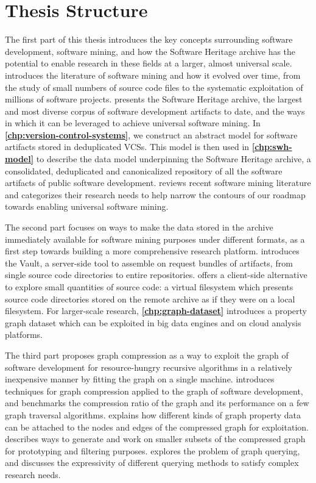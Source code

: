 \chapter*{Thesis Structure}

The first part of this thesis introduces the key concepts surrounding
software development, software mining, and how the Software Heritage archive
has the potential to enable research in these fields at a larger, almost
universal scale.
\textbf{} introduces the literature of software mining
and how it evolved over time, from the study of small numbers of source code
files to the systematic exploitation of millions of software projects.
\textbf{} presents the Software Heritage archive,
the largest and most diverse corpus of software development artifacts to date,
and the ways in which it can be leveraged to achieve universal software mining.
In \textbf{\cref{chp:version-control-systems}}, we construct an abstract model
for software artifacts stored in deduplicated \glspl{VCS}. This model is then
used in \textbf{\cref{chp:swh-model}} to describe the data model underpinning
the Software Heritage archive, a consolidated, deduplicated and canonicalized
repository of all the software artifacts of public software development.
\textbf{} reviews recent software mining
literature and categorizes their research needs to help narrow the contours of
our roadmap towards enabling universal software mining.

The second part focuses on ways to make the data stored in the
archive immediately available for software mining purposes under different
formats, as a first step towards building a more comprehensive research
platform. \textbf{} introduces the Vault, a server-side tool to
assemble on request bundles of artifacts, from single source code directories
to entire repositories. \textbf{} offers a client-side
alternative to explore small quantities of source code: a virtual filesystem
which presents source code directories stored on the remote archive as if they
were on a local filesystem.  For larger-scale research,
\textbf{\cref{chp:graph-dataset}} introduces a property graph dataset which can
be exploited in big data engines and on cloud analysis platforms.

The third part proposes graph compression as a way to exploit the graph of
software development for resource-hungry recursive algorithms in a relatively
inexpensive manner by fitting the graph on a single machine.
\textbf{} introduces techniques for graph
compression applied to the graph of software development, and benchmarks the
compression ratio of the graph and its performance on a few graph traversal
algorithms. \textbf{} explains how different kinds of
graph property data can be attached to the nodes and edges of the compressed
graph for exploitation. \textbf{} describes ways to
generate and work on smaller subsets of the compressed graph for prototyping
and filtering purposes. \textbf{} explores the problem
of graph querying, and discusses the expressivity of different querying methods
to satisfy complex research needs.

